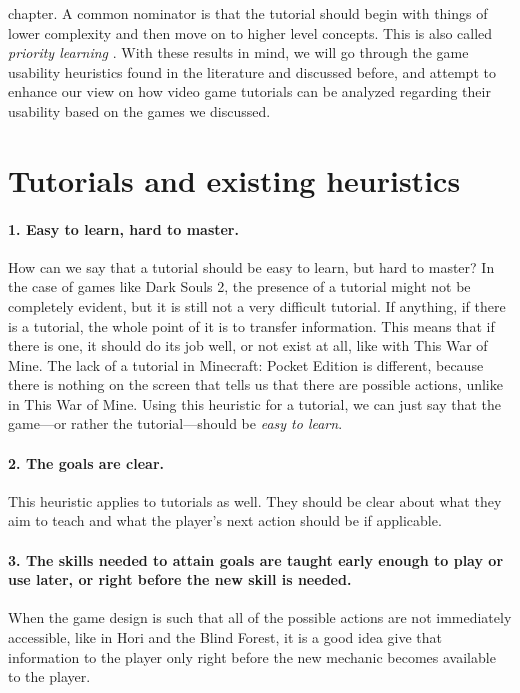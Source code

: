 chapter. A common nominator is that the tutorial should begin with things of lower complexity and then move on to higher level concepts. This is also called \textit{priority learning} \cite{Bycer2016}. With these results in mind, we will go through the game usability heuristics found in the literature and discussed before, and attempt to enhance our view on how video game tutorials can be analyzed regarding their usability based on the games we discussed.

\section{Tutorials and existing heuristics}
\paragraph{1. Easy to learn, hard to master.} How can we say that a tutorial should be easy to learn, but hard to master? In the case of games like Dark Souls 2, the presence of a tutorial might not be completely evident, but it is still not a very difficult tutorial. If anything, if there is a tutorial, the whole point of it is to transfer information. This means that if there is one, it should do its job well, or not exist at all, like with This War of Mine. The lack of a tutorial in Minecraft: Pocket Edition is different, because there is nothing on the screen that tells us that there are possible actions, unlike in This War of Mine. Using this heuristic for a tutorial, we can just say that the game---or rather the tutorial---should be \textit{easy to learn}.

\paragraph{2. The goals are clear. } This heuristic applies to tutorials as well. They should be clear about what they aim to teach and what the player's next action should be if applicable.

\paragraph{3. The skills needed to attain goals are taught early enough to play or use later, or right before the new skill is needed.} When the game design is such that all of the possible actions are not immediately accessible, like in Hori and the Blind Forest, it is a good idea give that information to the player only right before the new mechanic becomes available to the player. 

